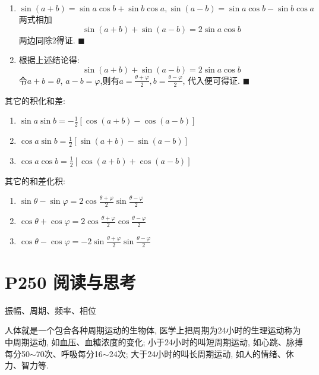 \documentclass{book}
\begin{document}
    \begin{enumerate}
        \item $$\sin (a+b)=\sin a\cos b+\sin b \cos a, \sin (a-b)=\sin a\cos b-\sin b \cos a$$\textcolor[rgb]{0.75,0.17,0.22}{两式相加}$$\sin(a+b)+\sin(a-b)=2\sin a\cos b$$两边同除2得证. $\blacksquare$
        \item 根据上述结论得:$$\sin(a+b) +\sin(a-b)=2\sin a\cos b$$\textcolor[rgb]{0.75,0.17,0.22}{令$a+b=\theta$, $a-b=\varphi$,则有$\displaystyle a=\frac{\theta+\varphi}{2},b=\frac{\theta-\varphi}{2}$}, 代入便可得证. $\blacksquare$
    \end{enumerate}

    其它的\textcolor[rgb]{0.38,0.11,0.2}{积化和差}:
    \begin{enumerate}
        \item $\displaystyle \sin a\sin b=-\frac{1}{2}[\cos(a+b)-\cos(a-b)]$
        \item $\displaystyle \cos a\sin b=\frac{1}{2}[\sin(a+b)-\sin(a-b)]$
        \item $\displaystyle \cos a\cos b=\frac{1}{2}[\cos(a+b) +\cos(a-b)]$
    \end{enumerate}

    其它的\textcolor[rgb]{0.38,0.11,0.2}{和差化积}:

    \begin{enumerate}
        \item $\displaystyle \sin \theta-\sin \varphi=2\cos\frac{\theta+\varphi}{2}\sin\frac{\theta-\varphi}{2}$
        \item $\displaystyle \cos \theta+\cos \varphi=2\cos \frac{\theta+\varphi}{2} \cos \frac{\theta-\varphi}{2}$
        \item $\displaystyle \cos \theta-\cos \varphi=-2\sin \frac{\theta+\varphi}{2} \sin \frac{\theta-\varphi}{2}$
    \end{enumerate}

    \section{\textcolor[rgb]{0.11,0.65,0.52}{P250 阅读与思考}}
    
    \begin{center}
        振幅、周期、频率、相位
    \end{center}

    人体就是一个包合各种周期运动的生物体, 医学上把周期为24小时的生理运动称为中周期运动, 如血压、血糖浓度的变化; 小于24小时的叫短周期运动,  如心跳、脉搏每分50$\sim$70次、呼吸每分16$\sim$24次; 大于24小时的叫长周期运动, 如人的情绪、休力、智力等. 
    
\end{document}
